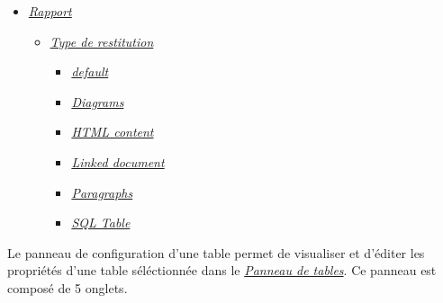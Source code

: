 \documentclass[letterpaper,10pt,english]{sphinxmanual}
\begin{document}
{\begin{minipage}{0.95\linewidth}
\begin{itemize}
\begin{itemize}
\begin{itemize}
\begin{itemize}
\end{itemize}

\end{itemize}

\item {} 
\label{tables/infopanel:id9}{\hyperref[tables/infopanel:rapport]{\emph{Rapport}}}
\begin{itemize}
\item {} 
\label{tables/infopanel:id10}{\hyperref[tables/infopanel:type-de-restitution]{\emph{Type de restitution}}}
\begin{itemize}
\item {} 
\label{tables/infopanel:id11}{\hyperref[tables/infopanel:default]{\emph{default}}}

\item {} 
\label{tables/infopanel:id12}{\hyperref[tables/infopanel:diagrams]{\emph{Diagrams}}}

\item {} 
\label{tables/infopanel:id13}{\hyperref[tables/infopanel:html-content]{\emph{HTML content}}}

\item {} 
\label{tables/infopanel:id14}{\hyperref[tables/infopanel:linked-document]{\emph{Linked document}}}

\item {} 
\label{tables/infopanel:id15}{\hyperref[tables/infopanel:paragraphs]{\emph{Paragraphs}}}

\item {} 
\label{tables/infopanel:id16}{\hyperref[tables/infopanel:sql-table]{\emph{SQL Table}}}

\end{itemize}

\end{itemize}

\end{itemize}

\end{itemize}
\end{minipage}}
\begin{center}\setlength{\fboxsep}{5pt}\end{center}

Le panneau de configuration d'une table permet de visualiser et d'éditer
les propriétés d'une table séléctionnée dans le {\hyperref[tables/tbllist::doc]{\emph{\emph{Panneau de tables}}}}. Ce
panneau est composé de 5 onglets.
\end{document}
